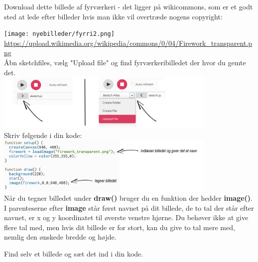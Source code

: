 \documentclass{ucph-handout}
\begin{document}
\newpage

\begin{exercisebox}[adjusted title=Billeder]
Download dette billede af fyrværkeri - det ligger på wikicommons, som er et godt sted at lede efter billeder hvis man ikke vil overtræde nogens copyright:

\vspace{3mm}
\quad \texttt{[image: nyebilleder/fyrri2.png]}\\ 
\url{https://upload.wikimedia.org/wikipedia/commons/0/04/Firework_transparent.png} \\

Åbn sketchfiles, vælg "Upload file" og find fyrværkeribilledet der hvor du gemte det.\\

\includegraphics[width=0.8\textwidth]{nyebilleder/topile.jpg} \\

Skriv følgende i din kode:\\

\quad\quad\includegraphics[width=0.8\textwidth]{nyebilleder/billedekode.jpg} \\

Når du tegner billedet under \textbf{draw()} bruger du en funktion der hedder \textbf{image()}. \\

I parenteserne efter \textbf{image} står først navnet på dit billede, de to tal der står efter navnet, er x og y koordinatet til øverste venstre hjørne. Du behøver ikke at give flere tal med, men hvis dit billede er for stort, kan du give to tal mere med, nemlig den ønskede bredde og højde. 
\vspace{3mm}

\vspace{3mm}
Find selv et billede og sæt det ind i din kode.

\end{exercisebox}
\end{document}
